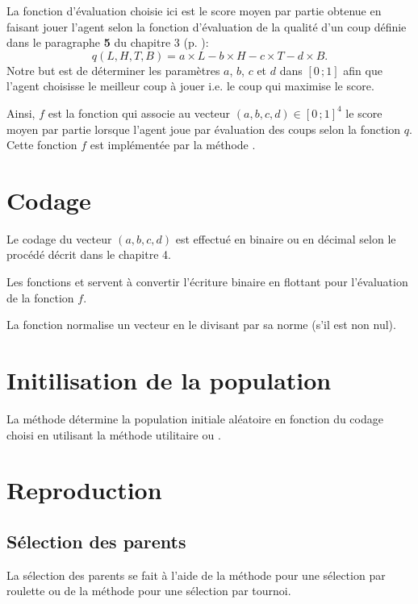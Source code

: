 La fonction d'évaluation choisie ici est le score moyen par partie obtenue en faisant jouer l'agent selon la fonction d'évaluation de la qualité d'un coup définie dans le paragraphe \textbf{5} du chapitre 3 (p. \pageref{evaluation_des_coups}):
$$q(L,H,T,B)=a\times L - b\times H - c\times T - d\times B.$$
Notre but est de déterminer les paramètres $a$, $b$, $c$ et $d$ dans $[0\,;1]$ afin que l'agent choisisse le meilleur coup à jouer i.e. le coup qui maximise le score.

Ainsi, $f$ est la fonction qui associe au vecteur $(a,b,c,d)\in[0\,;1]^4$ le score moyen par partie lorsque l'agent joue par évaluation des coups selon la fonction $q$.
Cette fonction $f$ est implémentée par la méthode .

\section{Codage}

Le codage du vecteur $(a,b,c,d)$ est effectué en binaire ou en décimal selon le procédé décrit dans le chapitre 4. 

Les fonctions  et  servent à convertir l'écriture binaire en flottant pour l'évaluation de la fonction $f$.

La fonction  normalise un vecteur en le divisant par sa norme (s'il est non nul).

\section{Initilisation de la population}

La méthode  détermine la population initiale aléatoire en fonction du codage choisi en utilisant la méthode utilitaire  ou .

\section{Reproduction}

\subsection{Sélection des parents}

La sélection des parents se fait à l'aide de la méthode  pour une sélection par \og roulette \fg{} ou de la méthode  pour une sélection par tournoi.

